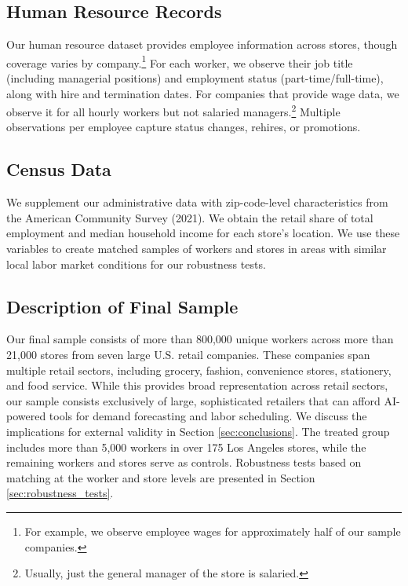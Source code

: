 \documentclass[letterpaper,11pt,leqno]{article}
\theoremstyle{paper}
\begin{document}
\subsection{Human Resource Records}

Our human resource dataset provides employee information across stores, though coverage varies by company.\footnote{For example, we observe employee wages for approximately half of our sample companies.} For each worker, we observe their job title (including managerial positions) and employment status (part-time/full-time), along with hire and termination dates. For companies that provide wage data, we observe it for all hourly workers but not salaried managers.\footnote{Usually, just the general manager of the store is salaried.} Multiple observations per employee capture status changes, rehires, or promotions.

\subsection{Census Data}
We supplement our administrative data with zip-code-level characteristics from the American Community Survey (2021). We obtain the retail share of total employment and median household income for each store's location. We use these variables to create matched samples of workers and stores in areas with similar local labor market conditions for our robustness tests. 



\subsection{Description of Final Sample} \label{subsec:summ_stats}

Our final sample consists of more than 800,000 unique workers across more than 21,000 stores from seven large U.S. retail companies. These companies span multiple retail sectors, including grocery, fashion, convenience stores, stationery, and food service. While this provides broad representation across retail sectors, our sample consists exclusively of large, sophisticated retailers that can afford AI-powered tools for demand forecasting and labor scheduling. We discuss the implications for external validity in Section \ref{sec:conclusions}. The treated group includes more than 5,000 workers in over 175 Los Angeles stores, while the remaining workers and stores serve as controls. Robustness tests based on matching at the worker and store levels are presented in Section \ref{sec:robustness_tests}.
\end{document}
